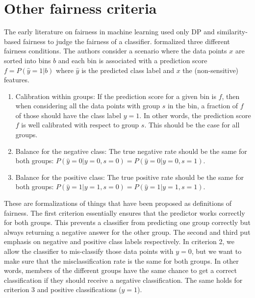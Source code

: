 \section{Other fairness criteria}%
\label{improved-definitions-of-fairness}
The early literature on fairness in machine learning used only \ac{DP}
and si\-mi\-la\-ri\-ty-based fairness to judge the fairness of a classifier.
\citet{kleinberg2016inherent} formalized three different fairness conditions.
The authors consider a scenario where the data points \(x\) are sorted into bins \(b\)
and each bin is associated with a prediction score \(f = P(\hat{y}=1|b)\)
where \(\hat{y}\) is the predicted class label and \(x\) the (non-sensitive) features.
\begin{enumerate}
\item
  Calibration within groups:
  If the prediction score for a given bin is \(f\),
  then when considering all the data points with group \(s\) in the bin,
  a fraction of \(f\) of those should have the class label \(y=1\).
  In other words, the prediction score \(f\) is well calibrated with respect to group \(s\).
  This should be the case for all groups.
\item
  Balance for the negative class:
  The true negative rate should be the same for both groups: \(P(\hat{y}=0|y=0,s=0) = P(\hat{y}=0|y=0,s=1)\).
\item
  Balance for the positive class:
  The true positive rate should be the same for both groups: \(P(\hat{y}=1|y=1,s=0) = P(\hat{y}=1|y=1,s=1)\).
\end{enumerate}
These are formalizations of things that have been proposed as definitions of fairness.
The first criterion essentially ensures that the predictor works correctly for both groups.
This prevents a classifier from predicting one group correctly
but always returning a negative answer for the other group.
The second and third put emphasis on negative and positive class labels respectively.
In criterion 2, we allow the classifier to mis-classify those data points with \(y=0\),
but we want to make sure that the misclassification rate is the same for both groups.
In other words, members of the different groups have the same chance
to get a correct classification if they should receive a negative classification.
The same holds for criterion 3 and positive classifications (\(y=1\)).

